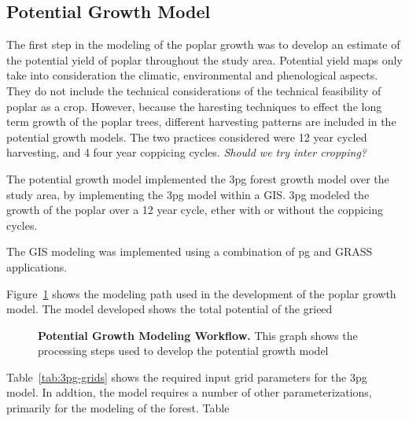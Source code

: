 \documentclass[10pt]{article}
\begin{document}
\subsection*{Potential Growth Model}

The first step in the modeling of the poplar growth was to develop an
estimate of the potential yield of poplar throughout the study area.
Potential yield maps only take into consideration the climatic,
environmental and phenological aspects.  They do not include the
technical considerations of the technical feasibility of poplar as a
crop.  However, because the haresting techniques to effect the long
term growth of the poplar trees, different harvesting patterns are
included in the potential growth models.  The two practices considered
were 12 year cycled harvesting, and 4 four year coppicing cycles.
\emph{Should we try inter cropping?}

The potential growth model implemented the \ac{3pg} forest growth
model over the study area, by implementing the \ac{3pg} model within a
\ac{GIS}.  \ac{3pg} modeled the growth of the poplar over a 12 year
cycle, ether with or without the coppicing cycles.  

The \ac{GIS} modeling was implemented using a combination of \ac{pg}
and \ac{GRASS} applications.

Figure~\ref{fig:growth-model} shows the modeling path used in the
development of the poplar growth model. The model developed shows the
total potential of the grieed

\begin{figure}[!ht]
\begin{center}
\end{center}
\caption{ {\bf Potential Growth Modeling Workflow.} This graph shows
  the processing steps used to develop the potential growth model }
\label{fig:growth-model}
\end{figure}

Table~\ref{tab:3pg-grids} shows the required input grid parameters for
the \ac{3pg} model.  In addtion, the model requires a number of other
parameterizations, primarily for the modeling of the forest. Table
\end{document}
